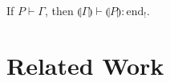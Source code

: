 \documentclass[orivec,envcountsame]{llncs}
\newcommand{\cpdual}[1]{#1^\perp}
\newcommand{\gvdual}[1]{\overline{#1}}
\newcommand{\gvout}[2]{{!#1.#2}}
\newcommand{\outterm}{\mathrm{end}_!}
\newcommand{\gvservice}[1]{\sharp #1}
\newcommand{\cptyp}[2]{#1 \vdash #2}
\newcommand{\gvtyp}[3]{#1 \vdash #2 : #3}
\newcommand{\mkwd}[1]{\mathsf{#1}}
\newcommand{\link}[2]{#1 \leftrightarrow #2}
\newcommand{\cut}[4]{\mkwd{new}\:#1 \: (#3 \mid #4)}
\newcommand{\replicate}[2]{{!#1(#2)}}
\newcommand{\derelict}[2]{{?#1[#2]}}
\newcommand{\rec}[1]{\mkwd{rec}\:#1}
\newcommand{\corec}[5]{\mkwd{corec}\:#1 \langle #2 \rangle (#4,#5)}
\newcommand{\clabel}[1]{\mathrm{#1}}
\renewcommand{\case}[2]{\mkwd{case}\:#1\:\{#2\}}
\newcommand{\sel}[2]{#1[\clabel{#2}]}
\newcommand{\gvsend}[2]{\mkwd{send}\:#1\:#2}
\newcommand{\gvreceive}[1]{\mkwd{receive}\:#1}
\newcommand{\gvlet}[3]{\mkwd{let}\;#1 = #2\;\mkwd{in}\;#3}
\newcommand{\gvselect}[2]{\mkwd{select}\:#1\:#2}
\newcommand{\gvcase}[2]{\mkwd{case}\:#1\:\{#2\}}
\newcommand{\gvlink}[2]{\mkwd{link}\:#1\:#2}
\newcommand{\gvfork}[2]{\mkwd{fork}\:#1.#2}
\newcommand{\lrkwd}{\mkwd{fix}}
\newcommand{\gvfix}[3]{\lrkwd\:#1\:#2 = #3}
\newcommand{\gvserve}[2]{\mkwd{serve}\:#1.#2}
\newcommand{\gvrequest}[1]{\mkwd{request}\:#1}
\newcommand{\togv}[1]{\llparenthesis #1 \rrparenthesis}
\begin{document}



\begin{theorem}
  If $\cptyp{P}{\Gamma}$, then $\gvtyp{\togv{\Gamma}}{\togv{P}}{\outterm}$.
\end{theorem}

\section{Related Work}\label{sec:related}
\end{document}
